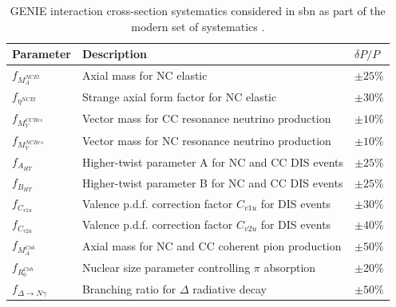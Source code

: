 \begin{table}[h!]
    \renewcommand{\arraystretch}{1.4}
    \begin{tabular}{p{1.9cm} p{9.25cm}>{\centering\arraybackslash}p{2.06cm}}
        \toprule
         Parameter & Description & $\delta P / P$ \\
        \midrule
         $f_{M_{A}^{NCEl}}$  & Axial mass for NC elastic & $\pm 25\%$ \\
         
         $f_{\eta^{NCEl}}$    & Strange axial form factor for NC elastic & $\pm 30\%$ \\
        
         
         $f_{M_{V}^{CCRes}}$ & Vector mass for CC resonance neutrino production & $\pm 10\%$ \\
         
         $f_{M_{V}^{NCRes}}$ & Vector mass for NC resonance neutrino production & $\pm 10\%$ \\
         
         $f_{A_{HT}}$          & Higher-twist parameter A for NC and CC DIS events & $\pm 25\%$ \\
         
         $f_{B_{HT}}$          & Higher-twist parameter B for NC and CC DIS events & $\pm 25\%$ \\
         
         $f_{C_{v1u}}$         & Valence p.d.f. correction factor $C_{v1u}$ for DIS events & $\pm 30\%$ \\
         
         $f_{C_{v2u}}$         & Valence p.d.f. correction factor $C_{v2u}$ for DIS events & $\pm 40\%$ \\
         
         $f_{M_{A}^{Coh}}$     & Axial mass for NC and CC coherent pion production & $ \pm 50 \%$ \\
         
         $f_{R_{0}^{Coh}}$     & Nuclear size parameter controlling $\pi$ absorption & $\pm 20 \%$ \\
        
        $f_{\Delta\rightarrow N\gamma}$   & Branching ratio for $\Delta$ radiative decay & $\pm 50 \%$ \\
        
        \bottomrule
        
    \end{tabular}
    \caption[Modern interaction cross-section systematic parameters.]{GENIE interaction cross-section systematics considered in \gls{sbn} as part of the modern set of systematics \cite{GENIE_manual}.}
    \label{table:modern_xsec_syst}
\end{table}


